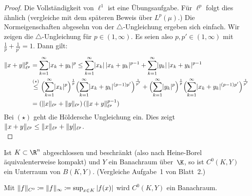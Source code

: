 \begin{proof}
    Die Vollständigkeit von $\ell^1$ ist eine Übungsaufgabe. Für $\ell^p$ folgt
    dies ähnlich (vergleiche mit dem späteren Beweis über $L^p(\mu)$.) %
    Die Normeigenschaften abgesehn von der $\triangle$-Ungleichung ergeben sich
    einfach. Wir zeigen die $\triangle$-Ungleichung für $p\in(1,\infty)$. Es
    seien also $p,p'\in(1,\infty)$ mit $\frac{1}{p}+\frac{1}{p'}=1$. Dann gilt:
    \begin{align*}
        \lVert x+y\rVert_{\ell^{p}}^p 
        &= \sum_{k=1}^\infty \lvert x_k+y_k\rvert^p
        \leq \sum_{k=1}^\infty \lvert x_k\rvert \, \lvert x_k+y_k\rvert^{p-1}
        + \sum_{k=1}^\infty \lvert y_k\rvert\, \lvert x_k+y_k\rvert^{p-1}
        \\
        &\overset{(\star)}\leq 
        \Bigl( \sum_{k=1}^\infty \lvert x_k\rvert^p \Bigr)^{\frac{1}{p}}
        \Bigl( \sum_{k=1}^\infty \lvert x_k+y_k\rvert^{(p-1)p'} \Bigr)^{\frac{1}{p'}} 
        +
        \Bigl( \sum_{k=1}^\infty \lvert y_k\rvert^p \Bigr)^{\frac{1}{p}} 
        \Bigl( \sum_{k=1}^\infty \lvert x_k+y_k\rvert^{(p-1)p'} \Bigr)^{\frac{1}{p'}}
        \\
        &= (\lVert x\rVert_{\ell^{p}} + \lVert y\rVert_{\ell^{p}}) \, (\lVert x+y\rVert_{\ell^{p}}^{p-1})
    \end{align*}
    Bei $(\star)$ geht die Höldersche Ungleichung ein.
    Dies zeigt $\lVert x+y\rVert_{\ell^{p}} \leq \lVert x\rVert_{\ell^{p}} + \lVert y\rVert_{\ell^{p}}$.
    \\
\end{proof}

\begin{thEmpty}
    Ist $K\subset\R^n$ abgeschlossen und beschränkt (also nach Heine-Borel
    äquivalenterweise kompakt) und $Y$ ein Banachraum über~$\K$, so ist
    $C^0(K,Y)$ ein Unterraum von $B(K,Y)$. (Vergleiche Aufgabe~1 von Blatt~2.)
    
    \nnSatz
    Mit $\lVert f\rVert_{C^0} \coloneqq \lVert f\rVert_\infty \coloneqq \sup_{x\in K} \, \lvert f(x)\rvert$
    wird $C^0(K,Y)$ ein Banachraum.
\end{thEmpty}

